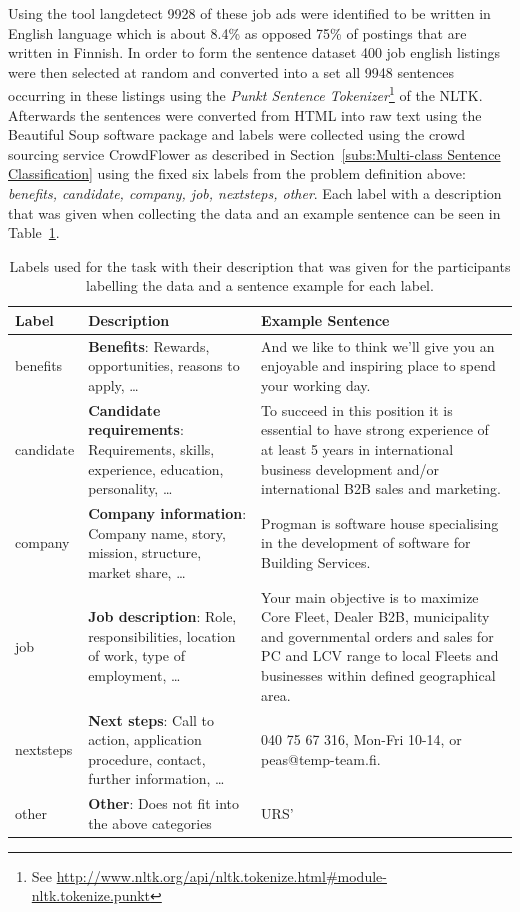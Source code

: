 Using the tool \gls{langdetect} 9928 of these job ads were identified to be written in English language which is about 8.4\% as opposed 75\% of postings that are written in Finnish.
In order to form the sentence dataset 400 job english listings were then selected at random and converted into a set all 9948 sentences occurring in these listings using the \emph{Punkt Sentence Tokenizer}\footnote{See \url{http://www.nltk.org/api/nltk.tokenize.html\#module-nltk.tokenize.punkt}} of the \gls{NLTK}. Afterwards the sentences were converted from HTML into raw text using the \gls{Beautiful Soup} software package and labels were collected using the \gls{crowd sourcing} service \gls{CrowdFlower} as described in Section~\ref{subs:Multi-class Sentence Classification} using the fixed six labels from the problem definition above: \emph{benefits, candidate, company, job, nextsteps, other}. Each label with a description that was given when collecting the data and an example sentence can be seen in Table~\ref{tab:Labels, Description, Example Sentences}.

\begin{table}[h]
  \begin{center}
  \begin{tabularx}{\textwidth}{l | X | X}
    \toprule
    Label & Description & Example Sentence \\
    \midrule
    benefits & \textbf{Benefits}: Rewards, opportunities, reasons to apply, \ldots & And we like to think we’ll give you an enjoyable and inspiring place to spend your working day. \\
    candidate & \textbf{Candidate requirements}: Requirements, skills, experience, education, personality, \ldots & To succeed in this position it is essential to have strong experience of at least 5 years in international business development and/or international B2B sales and marketing. \\
    company & \textbf{Company information}: Company name, story, mission, structure, market share, \ldots & Progman is software house specialising in the development of software for Building Services. \\
    job & \textbf{Job description}: Role, responsibilities, location of work, type of employment, \ldots & Your main objective is to maximize Core Fleet, Dealer B2B, municipality and governmental orders and sales for PC and LCV range to local Fleets and businesses within defined geographical area. \\
    nextsteps & \textbf{Next steps}: Call to action, application procedure, contact, further information, \ldots & 040 75 67 316, Mon-Fri 10-14, or peas@temp-team.fi. \\
    other & \textbf{Other}: Does not fit into the above categories & URS’ \\
    \bottomrule
  \end{tabularx}
  \caption{Labels used for the task with their description that was given for the participants labelling the data and a sentence example for each label.}
\label{tab:Labels, Description, Example Sentences}
\end{center}
\end{table}

